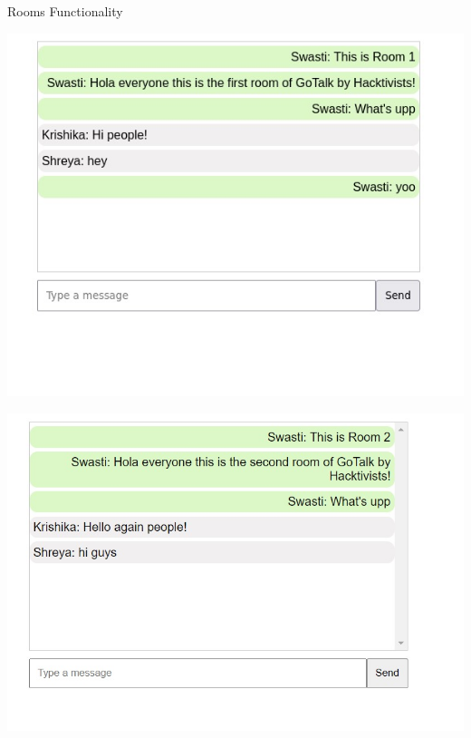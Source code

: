 \documentclass{beamer}
\begin{document}
\begin{frame}{Rooms Functionality}
        \begin{minipage}[t]{0.3\textwidth}
            \centering
            \includegraphics[width=\textwidth]{Pictures/room1.jpg}
        \end{minipage}
        \hfill
        \begin{minipage}[t]{0.3\textwidth}
            \centering
            \includegraphics[width=\textwidth]{Pictures/room2.jpg}
        \end{minipage}
        \hfill
        \begin{minipage}[t]{0.3\textwidth}
            \centering

\end{minipage}
\end{frame}
\end{document}
